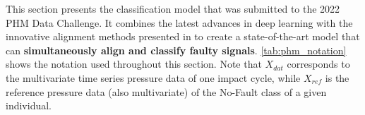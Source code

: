 This section presents the classification model that was submitted to the 2022 PHM Data Challenge. 
It combines the latest advances in deep learning with the innovative alignment methods presented in \cite{martinez2022closed} to create a state-of-the-art model that can \textbf{simultaneously align and classify faulty signals}. %
\cref{tab:phm_notation} shows the notation used throughout this section. Note that $X_{dat}$ corresponds to the multivariate time series pressure data of one impact cycle, while $X_{ref}$ is the reference pressure data (also multivariate) of the No-Fault class of a given individual. 



